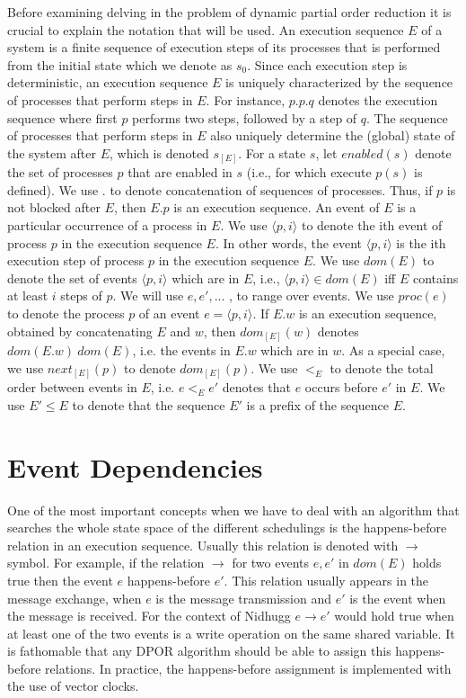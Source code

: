 Before examining delving in the problem of dynamic partial order reduction it is crucial to explain the notation that will be used.
An execution sequence $E$ of a system is a finite sequence of
execution steps of its processes that is performed from the initial
state which we denote as $s_0$. Since each execution step is deterministic, an execution
sequence $E$ is uniquely characterized by the sequence of processes
that perform steps in $E$. For instance, $p.p.q$ denotes the execution
sequence where first $p$ performs two steps, followed by a step of $q$.
The sequence of processes that perform steps in $E$ also uniquely
determine the (global) state of the system after $E$, which is denoted
$s_{[E]}$. For a state $s$, let $enabled(s)$ denote the set of processes $p$ that
are enabled in $s$ (i.e., for which execute $p(s)$ is defined). We use $.$ to
denote concatenation of sequences of processes. Thus, if $p$ is not
blocked after $E$, then $E.p$ is an execution sequence.
An event of $E$ is a particular occurrence of a process in $E$.
We use $\langle p,i \rangle$ to denote the ith event of process $p$ in the execution
sequence $E$. In other words, the event $\langle p,i \rangle$ is the ith execution step
of process $p$ in the execution sequence $E$. We use $dom(E)$ to denote
the set of events $\langle p,i \rangle$ which are in $E$, i.e., $\langle p,i \rangle \in dom(E)$ iff $E$
contains at least $i$ steps of $p$. We will use $e,e',...$ , to range over
events. We use $proc(e)$ to denote the process $p$ of an event $e = \langle p, i \rangle$.
If $E.w$ is an execution sequence, obtained by concatenating $E$ and
$w$, then $dom_{[E]}(w)$ denotes $dom(E.w) \ dom(E)$, i.e. the events in
$E.w$ which are in $w$. As a special case, we use $next_{[E]}(p)$ to denote
$dom_{[E]}(p)$.
We use $<_E$ to denote the total order between events in $E$, i.e.
$e <_E e'$  denotes that $e$ occurs before $e'$  in $E$. We use $E'\leq E$ to
denote that the sequence $E'$ is a prefix of the sequence $E$.

\section{Event Dependencies}

One of the most important concepts when we have to deal with an algorithm that searches the whole state space of the different schedulings is the 
happens-before relation in an execution sequence. Usually this relation is denoted with $\rightarrow$ symbol. For example, if the relation $\rightarrow$ 
for two events $e,e'$ in $dom(E)$ holds true then the event $e$ happens-before $e'$. This relation usually appears in the message exchange, when $e$ is the message
transmission and $e'$ is the event when the message is received. For the context of Nidhugg $e \rightarrow e'$ would hold true when at least one of the two events
is a write operation on the same shared variable. It is fathomable that any DPOR algorithm should be able to assign this happens-before relations. 
In practice, the happens-before assignment is implemented with the use of vector clocks.


